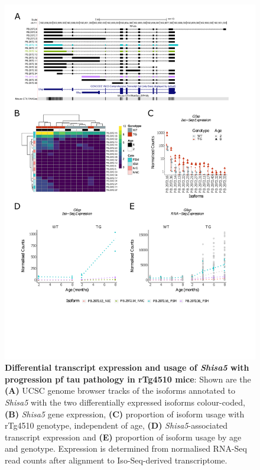 \begin{figure}[!htp]
	\centering
	\includegraphics[page=5,trim={1.5cm 1.5cm 2cm 1cm}, scale = 0.80]{Figures/Ch5_DiffPlots.pdf}
	\captionsetup{width=0.95\textwidth}
	\caption[Differential \textit{Shisa5} transcript expression and usage]%
	{\textbf{Differential transcript expression and usage of \textit{Shisa5} with progression pf tau pathology in rTg4510 mice}: Shown are the \textbf{(A)} UCSC genome browser tracks of the isoforms annotated to \textit{Shisa5} with the two differentially expressed isoforms colour-coded, \textbf{(B)} \textit{Shisa5} gene expression, \textbf{(C)} proportion of isoform usage with rTg4510 genotype, independent of age, \textbf{(D)} \textit{Shisa5}-associated transcript expression and \textbf{(E)} proportion of isoform usage by age and genotype. Expression is determined from normalised RNA-Seq read counts after alignment to Iso-Seq-derived transcriptome.} 
	\label{fig:DIU_shisa5}
\end{figure}

